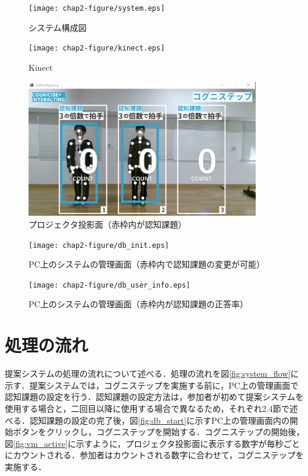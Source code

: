 \begin{figure}[tbp]
	\centering
			\texttt{[image: chap2-figure/system.eps]}
	\caption{システム構成図}
	\label{fig:system}
\end{figure}

\begin{figure}[tbp]
	\centering
			\texttt{[image: chap2-figure/kinect.eps]}
	\caption{Kinect}
	\label{fig:kinect}
\end{figure}
\fi

\begin{figure}[tbp]
	\centering
			\includegraphics[width=0.9\textwidth]{chap2-figure/vm_init.eps}
	\caption{プロジェクタ投影面（赤枠内が認知課題）}
	\label{fig:projection_surface}
\end{figure}

\begin{figure}[tbp]
	\centering
			\texttt{[image: chap2-figure/db\_init.eps]}
	\caption{PC上のシステムの管理画面（赤枠内で認知課題の変更が可能）}
	\label{fig:system_management}
\end{figure}

\begin{figure}[tbp]
	\centering
			\texttt{[image: chap2-figure/db\_user\_info.eps]}
	\caption{PC上のシステムの管理画面（赤枠内が認知課題の正答率）}
	\label{fig:check_answer_rate}
\end{figure}


\section{処理の流れ}
提案システムの処理の流れについて述べる．処理の流れを図\ref{fig:system_flow}に示す．提案システムでは，コグニステップを実施する前に，PC上の管理画面で認知課題の設定を行う．認知課題の設定方法は，参加者が初めて提案システムを使用する場合と，二回目以降に使用する場合で異なるため，それぞれ2.4節で述べる．認知課題の設定の完了後，図\ref{fig:db_start}に示すPC上の管理画面内の開始ボタンをクリックし，コグニステップを開始する．コグニステップの開始後，図\ref{fig:vm_active}に示すように，プロジェクタ投影面に表示する数字が毎秒ごとにカウントされる．参加者はカウントされる数字に合わせて，コグニステップを実施する．　

